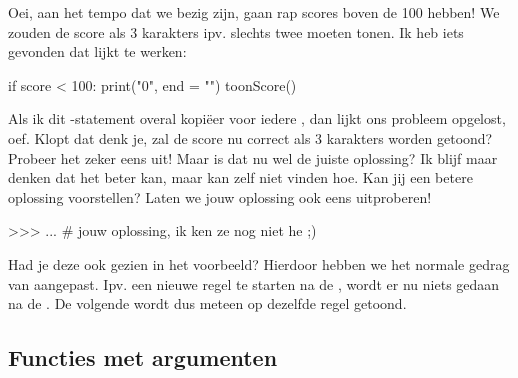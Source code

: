 \begin{letsTryOut}
	Oei, aan het tempo dat we bezig zijn,
	gaan rap scores boven de 100 hebben!
	\newline
	We zouden de score als 3 karakters ipv. slechts twee moeten tonen.
	Ik heb iets gevonden dat lijkt te werken:
\begin{pyEnv}
if score < 100:
	print("0", end = "")
toonScore()
\end{pyEnv}
	Als ik dit -statement overal kopi\"eer voor iedere ,
	dan lijkt ons probleem opgelost, oef.
	\newline
	Klopt dat denk je, zal de score nu correct als 3 karakters worden getoond?
	\newline
	Probeer het zeker eens uit!
	\newline
	\newline
	Maar is dat nu wel de juiste oplossing?
	Ik blijf maar denken dat het beter kan,
	maar kan zelf niet vinden hoe.
	\newline
	Kan jij een betere oplossing voorstellen?
	\newline
	Laten we jouw oplossing ook eens uitproberen!
\begin{pyEnv}
>>> ... # jouw oplossing, ik ken ze nog niet he ;)
\end{pyEnv}
\end{letsTryOut}

\begin{brainy}
	\newline
	\newline
	Had je deze  ook gezien in het voorbeeld?
	\newline
	Hierdoor hebben we het normale gedrag van  aangepast.
	Ipv. een nieuwe regel te starten na de ,
	wordt er nu niets gedaan na de .
	De volgende  wordt dus meteen op dezelfde regel getoond.
\end{brainy}

\subsection{Functies met argumenten}

